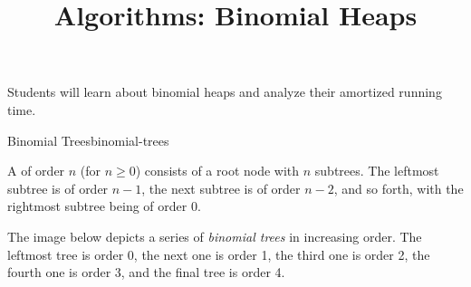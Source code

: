 \documentclass{tufte-handout}
\title{Algorithms: Binomial Heaps}
\date{}
\begin{document}
\maketitle

\begin{objective}
  Students will learn about binomial heaps and analyze their amortized running time.
\end{objective}

\begin{model*}{Binomial Trees}{binomial-trees}
  \begin{defn}
    A  of order $n$ (for $n \geq 0$) consists of a root
    node with $n$ subtrees. The leftmost subtree is of order $n-1$,
    the next subtree is of order $n-2$, and so forth, with the
    rightmost subtree being of order 0.
  \end{defn}

  The image below depicts a series of \emph{binomial trees} in
  increasing order. The leftmost tree is order 0, the next one is
  order 1, the third one is order 2, the fourth one is order 3, and
  the final tree is order 4.

  \begin{center}
  
  \end{center}
  \label{binomial-trees}
\end{model*}
\end{document}
